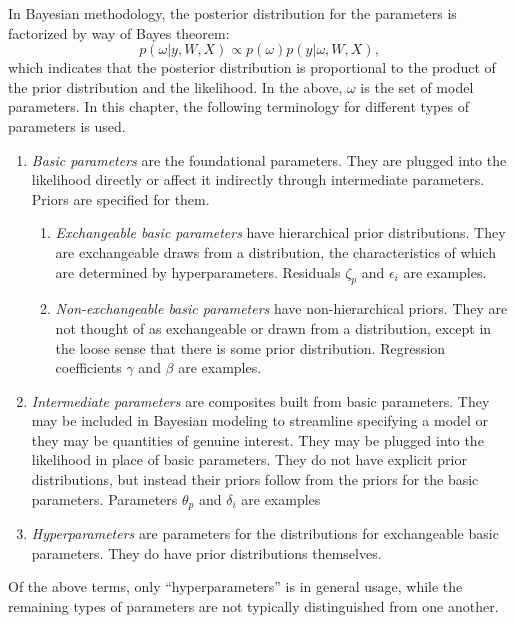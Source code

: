 \documentclass[12pt, letterpaper]{article}
\begin{document}
In Bayesian methodology, the posterior distribution for the parameters is factorized by way of Bayes theorem:
\begin{equation} \label{eq:bayes}
	p(\omega | y, W, X) \propto
	p(\omega)
	p(y | \omega, W, X)
,\end{equation}
which indicates that the posterior distribution is proportional to the product of the prior distribution and the likelihood. In the above, $\omega$ is the set of model parameters. In this chapter, the following terminology for different types of parameters is used.
\begin{enumerate}
	\item \emph{Basic parameters}
	are the foundational parameters. They are plugged into the likelihood directly or affect it indirectly through intermediate parameters. Priors are specified for them.
	\begin{enumerate}
		\item \emph{Exchangeable basic parameters}
		have hierarchical prior distributions. They are exchangeable draws from a distribution, the characteristics of which are determined by hyperparameters. Residuals $\zeta_p$ and $\epsilon_i$ are examples.
		\item \emph{Non-exchangeable basic parameters}
		have non-hierarchical priors. They are not thought of as exchangeable or drawn from a distribution, except in the loose sense that there is some prior distribution. Regression coefficients $\gamma$ and $\beta$ are examples.
	\end{enumerate}
	\item \emph{Intermediate parameters}
	are composites built from basic parameters. They may be included in Bayesian modeling to streamline specifying a model or they may be quantities of genuine interest. They may be plugged into the likelihood in place of basic parameters. They do not have explicit prior distributions, but instead their priors follow from the priors for the basic parameters. Parameters $\theta_p$ and $\delta_i$ are examples
	\item \emph{Hyperparameters}
	are parameters for the distributions for exchangeable basic parameters. They do have prior distributions themselves.
\end{enumerate}
Of the above terms, only ``hyperparameters'' is in general usage, while the remaining types of parameters are not typically distinguished from one another.
\end{document}
